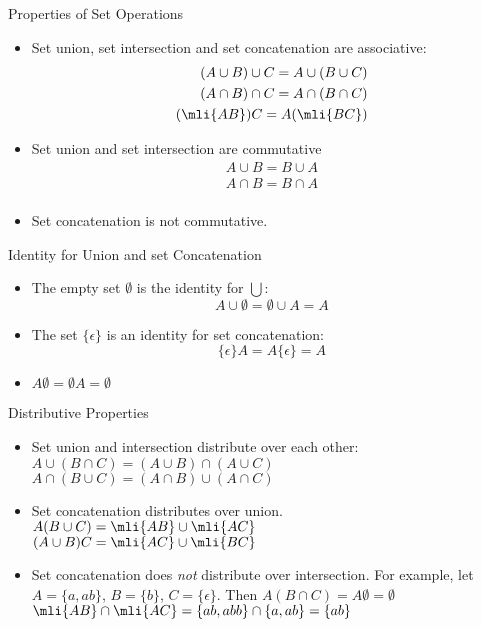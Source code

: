 \begin{slide}[bm=,toc=]{Properties of Set Operations}
\begin{itemize}
   \item Set union, set intersection and set concatenation are associative: 
   \[
     \begin{split}
     (A\cup B) \cup C = A \cup (B \cup C) \\
     (A\cap B) \cap C = A \cap (B \cap C) \\
     (\mli{AB})C = A(\mli{BC}) \\
     \end{split}
     \]
   \item Set union and set intersection are commutative
   \[
     \begin{split}
     A\cup B = B \cup A \\
     A\cap B = B \cap A \\
     \end{split}
    \]
    \item Set concatenation is not commutative.
\end{itemize}
\end{slide}

\begin{slide}[bm=,toc=]{Identity for Union and set Concatenation}
\begin{itemize}
   \item The empty set $\emptyset$ is the identity for $\bigcup$:
   \[
     A\cup \emptyset = \emptyset \cup A = A
     \]
   \item The set $\{\epsilon\}$ is an identity for set concatenation:
       \[
         \{\epsilon\}A = A\{\epsilon\} = A
       \]
   \item $A\emptyset = {\emptyset}A = \emptyset$
\end{itemize}
\end{slide}

\begin{slide}[bm=,toc=]{Distributive Properties}
\begin{itemize}
   \item  Set union and intersection distribute over each other:
   $A \cup (B \cap C) = (A\cup B)\cap(A \cup C)$\\
   $A \cap (B \cup C) = (A\cap B)\cup(A \cap C)$

   \item Set concatenation distributes over union. 
    $A(B\cup C) = \mli{AB} \cup \mli{AC}$\\
    $(A\cup B)C = \mli{AC} \cup \mli{BC}$
    \item Set concatenation does \emph{not} distribute over intersection. For
    example, let $A = \{a,ab\}$, $B = \{b\}$, $C = \{\epsilon\}$. Then
       $A(B\cap C) = A\emptyset = \emptyset$ \\
       $\mli{AB} \cap \mli{AC} = \{ab,abb\} \cap \{a,ab\} = \{ab\}$
\end{itemize}
\end{slide}

